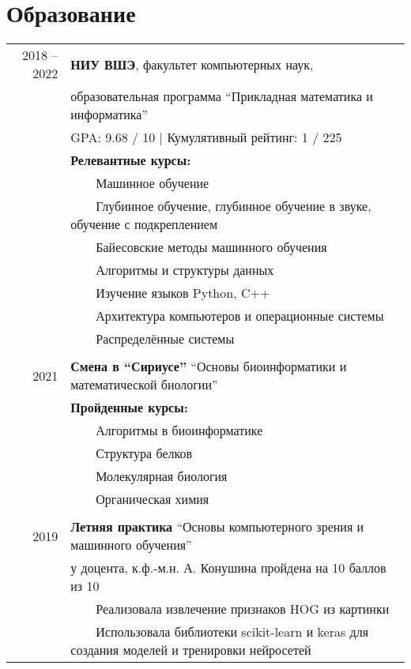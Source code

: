 \documentclass[a4paper,10pt]{article}
\newcommand{\tabitem}{~~\llap{\textbullet}~~}
\begin{document}
\section{Образование}
\begin{tabular}{rl}	
2018 -- 2022 & \textbf{НИУ ВШЭ}, факультет компьютерных наук, \\ & образовательная программа ``Прикладная математика и информатика''\\
& GPA: 9.68 / 10 | Кумулятивный рейтинг: 1 / 225 \\
& \textbf{Релевантные курсы:}\\
& \tabitem Машинное обучение \\
& \tabitem Глубинное обучение, глубинное обучение в звуке, обучение с подкреплением \\
& \tabitem Байесовские методы машинного обучения \\
& \tabitem Алгоритмы и структуры данных \\
& \tabitem Изучение языков Python, C++ \\
& \tabitem Архитектура компьютеров и операционные системы \\
& \tabitem Распределённые системы \\
& \\
2021 & \textbf{Смена в ``Сириусе''} ``Основы биоинформатики и математической биологии''\\
& \textbf{Пройденные курсы:} \\
& \tabitem Алгоритмы в биоинформатике \\
& \tabitem Структура белков \\
& \tabitem Молекулярная биология \\
& \tabitem Органическая химия \\
& \\
2019 & \textbf{Летняя практика} ``Основы компьютерного зрения и машинного обучения'' \\
& у доцента, к.ф.-м.н. А. Конушина пройдена на 10 баллов из 10 \\
& \tabitem Реализовала извлечение признаков HOG из картинки \\
& \tabitem Использовала библиотеки scikit-learn и keras для создания моделей и тренировки нейросетей 
\end{tabular}
\end{document}
